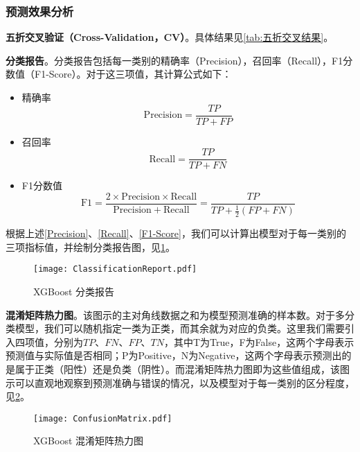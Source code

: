 \documentclass{MathorCupModeling}
\begin{document}
	\subsubsection{预测效果分析}
	\textbf{五折交叉验证（Cross-Validation，CV）}。具体结果见\textcolor{blue}{\cref{tab:五折交叉结果}}。
\begin{table}[H]
	\centering
	\caption{XGboost模型五折交叉验证结果}
	\label{tab:五折交叉结果}
\end{table}

\textbf{分类报告}。分类报告包括每一类别的精确率（Precision），召回率（Recall），F1分数值（F1-Score）。对于这三项值，其计算公式如下：
		\begin{itemize}
			\item {\heiti 精确率}
			\begin{equation}
				\mathrm{Precision} = \frac{TP}{TP+FP} \label{Precision}
			\end{equation}
			\item {\heiti 召回率}
			\begin{equation}
				\mathrm{Recall} = \frac{TP}{TP+FN} \label{Recall}
			\end{equation}
			\item {\heiti F1分数值} 
			\begin{equation}
				\mathrm{F}1 = \frac{2\times \mathrm{Precision}\times \mathrm{Recall}}{\mathrm{Precision}+\mathrm{Recall}}=\frac{TP}{TP+\frac{1}{2}\left(FP+FN\right)} \label{F1-Score}
			\end{equation}
		\end{itemize}
		根据上述\textcolor{blue}{\eqref{Precision}}、\textcolor{blue}{\eqref{Recall}}、\textcolor{blue}{\eqref{F1-Score}}，我们可以计算出模型对于每一类别的三项指标值，并绘制分类报告图，见\textcolor{blue}{\cref{fig:分类报告}}。
		\begin{figure}[H]
			\centering
			\texttt{[image: ClassificationReport.pdf]}
			\caption{XGBoost 分类报告}
			\label{fig:分类报告}
		\end{figure}

\textbf{混淆矩阵热力图}。该图示的主对角线数据之和为模型预测准确的样本数。对于多分类模型，我们可以随机指定一类为正类，而其余就为对应的负类。这里我们需要引入四项值，分别为$TP$、$FN$、$FP$、$TN$，其中T为True，F为False，这两个字母表示预测值与实际值是否相同；P为Positive，N为Negative，这两个字母表示预测出的是属于正类（阳性）还是负类（阴性）。而混淆矩阵热力图即为这些值组成，该图示可以直观地观察到预测准确与错误的情况，以及模型对于每一类别的区分程度，见\textcolor{blue}{\cref{fig:混淆矩阵热力图}}。
		\begin{figure}[H]
			\centering
			\texttt{[image: ConfusionMatrix.pdf]}
			\caption{XGBoost 混淆矩阵热力图}
			\label{fig:混淆矩阵热力图}
		\end{figure}
\end{document}
